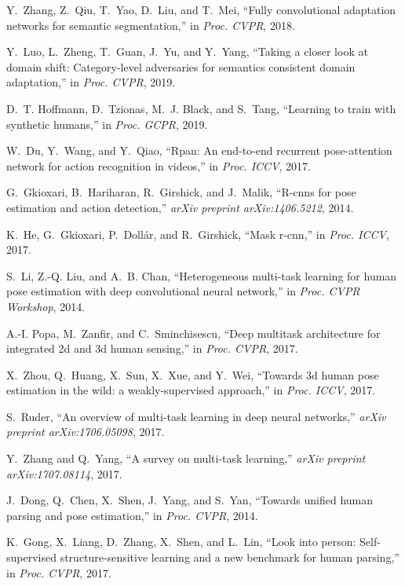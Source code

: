 \documentclass[final]{IEEEtran}
\begin{document}
{\begin{minipage}{\textwidth}
\begin{thebibliography}{1}
Y.~Zhang, Z.~Qiu, T.~Yao, D.~Liu, and T.~Mei, ``Fully convolutional adaptation
  networks for semantic segmentation,'' in \emph{Proc. CVPR}, 2018.

Y.~Luo, L.~Zheng, T.~Guan, J.~Yu, and Y.~Yang, ``Taking a closer look at domain
  shift: Category-level adversaries for semantics consistent domain
  adaptation,'' in \emph{Proc. CVPR}, 2019.

D.~T. Hoffmann, D.~Tzionas, M.~J. Black, and S.~Tang, ``Learning to train with
  synthetic humans,'' in \emph{Proc. GCPR}, 2019.

W.~Du, Y.~Wang, and Y.~Qiao, ``Rpan: An end-to-end recurrent pose-attention
  network for action recognition in videos,'' in \emph{Proc. ICCV}, 2017.

G.~Gkioxari, B.~Hariharan, R.~Girshick, and J.~Malik, ``R-cnns for pose
  estimation and action detection,'' \emph{arXiv preprint arXiv:1406.5212},
  2014.

K.~He, G.~Gkioxari, P.~Doll{\'a}r, and R.~Girshick, ``Mask r-cnn,'' in
  \emph{Proc. ICCV}, 2017.

S.~Li, Z.-Q. Liu, and A.~B. Chan, ``Heterogeneous multi-task learning for human
  pose estimation with deep convolutional neural network,'' in \emph{Proc. CVPR
  Workshop}, 2014.

A.-I. Popa, M.~Zanfir, and C.~Sminchisescu, ``Deep multitask architecture for
  integrated 2d and 3d human sensing,'' in \emph{Proc. CVPR}, 2017.

X.~Zhou, Q.~Huang, X.~Sun, X.~Xue, and Y.~Wei, ``Towards 3d human pose
  estimation in the wild: a weakly-supervised approach,'' in \emph{Proc. ICCV},
  2017.

S.~Ruder, ``An overview of multi-task learning in deep neural networks,''
  \emph{arXiv preprint arXiv:1706.05098}, 2017.

Y.~Zhang and Q.~Yang, ``A survey on multi-task learning,'' \emph{arXiv preprint
  arXiv:1707.08114}, 2017.

J.~Dong, Q.~Chen, X.~Shen, J.~Yang, and S.~Yan, ``Towards unified human parsing
  and pose estimation,'' in \emph{Proc. CVPR}, 2014.

K.~Gong, X.~Liang, D.~Zhang, X.~Shen, and L.~Lin, ``Look into person:
  Self-supervised structure-sensitive learning and a new benchmark for human
  parsing,'' in \emph{Proc. CVPR}, 2017.


\end{thebibliography}
\end{minipage}}
\end{document}
